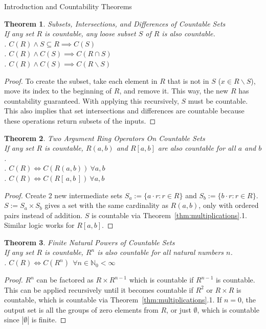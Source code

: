 \documentclass[12pt]{article}
\newtheorem{thm}{Theorem}
\begin{document}
\begin{section}{Introduction and Countability Theorems}
	\begin{thm}\label{thm:subsets}
		\emph{
			Subsets, Intersections, and Differences of Countable Sets\\
			\indent If any set $R$ is countable, any loose subset $S$ of $R$ is also countable.
			\vspace{0.4em}\\
			. $C(R)\land S\subseteq R\implies C(S)$\\
			. $C(R)\land C(S)\implies C(R\cap S)$\\
			. $C(R)\land C(S)\implies C(R\smallsetminus S)$
		}
	\end{thm}\begin{proof}
		To create the subset, take each element in $R$ that is not in $S$ ($x\in R\smallsetminus S$),
		move its index to the beginning of $R$, and remove it. This way, the new $R$ has countability
		guaranteed. With applying this recursively, $S$ must be countable. This also implies that set
		intersections and differences are countable because these operations return subsets of the
		inputs.
	\end{proof}

	\begin{thm}\label{thm:rings}
		\emph{
			Two Argument Ring Operators On Countable Sets\\
			\indent If any set $R$ is countable, $R(a, b)$ and $R[a, b]$ are also countable
			for all $a$ and $b$.\vspace{0.4em}\\
			. $C(R)\iff C(R(a, b))~\forall a,b$\\
			. $C(R)\iff C(R[\,a, b\,])~\forall a,b$
		}
	\end{thm}\begin{proof}
		Create 2 new intermediate sets $S_a := \{a\cdot r:r\in R\}$ and $S_b := \{b\cdot r:r\in R\}$.
		$S:=S_a\times S_b$ gives a set with the same cardinality as $R(a,b)$, only with
		ordered pairs instead of addition. $S$ is countable via Theorem~\ref{thm:multiplications}.1.
		Similar logic works for $R[a,b]$.
	\end{proof}

	\begin{thm}\label{thm:powers}
		\emph{
			Finite Natural Powers of Countable Sets\\
			\indent If any set $R$ is countable, $R^n$ is also countable for all natural
			numbers $n$.\vspace{0.4em}\\
			. $C(R)\iff C(R^n)~~\forall n\in\mathbb N_0<\infty$
		}
	\end{thm}\begin{proof}
		$R^n$ can be factored as $R\times R^{n-1}$ which is countable if $R^{n-1}$ is countable. This can be applied recursively until it becomes countable if $R^2$ or $R\times R$ is
		countable, which is countable via Theorem~\ref{thm:multiplications}.1. If $n=0$, the
		output set is all the groups of zero elements from $R$, or just $\emptyset$, which is countable
		since $\left|\emptyset\right|$ is finite.
	\end{proof}


\end{section}
\end{document}
